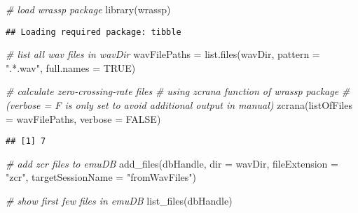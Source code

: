 \documentclass[
]{book}
\newenvironment{Shaded}{\begin{snugshade}}{\end{snugshade}}
\newcommand{\AttributeTok}[1]{\textcolor[rgb]{0.77,0.63,0.00}{#1}}
\newcommand{\CommentTok}[1]{\textcolor[rgb]{0.56,0.35,0.01}{\textit{#1}}}
\newcommand{\ConstantTok}[1]{\textcolor[rgb]{0.00,0.00,0.00}{#1}}
\newcommand{\FunctionTok}[1]{\textcolor[rgb]{0.00,0.00,0.00}{#1}}
\newcommand{\NormalTok}[1]{#1}
\newcommand{\OtherTok}[1]{\textcolor[rgb]{0.56,0.35,0.01}{#1}}
\newcommand{\StringTok}[1]{\textcolor[rgb]{0.31,0.60,0.02}{#1}}
\begin{document}
\begin{Shaded}
\begin{Highlighting}[]
\CommentTok{\# load wrassp package}
\FunctionTok{library}\NormalTok{(wrassp)}
\end{Highlighting}
\end{Shaded}

\begin{verbatim}
## Loading required package: tibble
\end{verbatim}

\begin{Shaded}
\begin{Highlighting}[]
\CommentTok{\# list all wav files in wavDir}
\NormalTok{wavFilePaths }\OtherTok{=} \FunctionTok{list.files}\NormalTok{(wavDir,}
                          \AttributeTok{pattern =} \StringTok{".*.wav"}\NormalTok{,}
                          \AttributeTok{full.names =} \ConstantTok{TRUE}\NormalTok{)}

\CommentTok{\# calculate zero{-}crossing{-}rate files}
\CommentTok{\# using zcrana function of wrassp package}
\CommentTok{\# (verbose = F is only set to avoid additional output in manual)}
\FunctionTok{zcrana}\NormalTok{(}\AttributeTok{listOfFiles =}\NormalTok{ wavFilePaths,}
       \AttributeTok{verbose =} \ConstantTok{FALSE}\NormalTok{)}
\end{Highlighting}
\end{Shaded}

\begin{verbatim}
## [1] 7
\end{verbatim}

\begin{Shaded}
\begin{Highlighting}[]
\CommentTok{\# add zcr files to emuDB}
\FunctionTok{add\_files}\NormalTok{(dbHandle,}
          \AttributeTok{dir =}\NormalTok{ wavDir,}
          \AttributeTok{fileExtension =} \StringTok{"zcr"}\NormalTok{,}
          \AttributeTok{targetSessionName =} \StringTok{"fromWavFiles"}\NormalTok{)}

\CommentTok{\# show first few files in emuDB}
\FunctionTok{list\_files}\NormalTok{(dbHandle)}
\end{Highlighting}
\end{Shaded}
\end{document}
